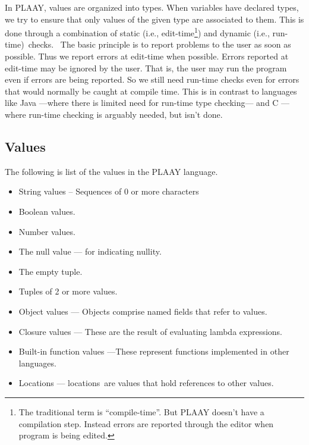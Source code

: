 \documentclass[12pt]{article}
\begin{document}
In PLAAY, values are organized into types. When variables have declared
types, we try to ensure that only values of the given type are associated to
them. This is done through a combination of static (i.e., edit-time\footnote{%
The traditional term is \textquotedblleft compile-time\textquotedblright .
But PLAAY doesn't have a compilation step. Instead errors are reported
through the editor when program is being edited.}) and dynamic (i.e.,
run-time)\ checks. \ The basic principle is to report problems to the user
as soon as possible. Thus we report errors at edit-time when possible.
Errors reported at edit-time may be ignored by the user. That is, the user
may run the program even if errors are being reported. So we still need
run-time checks even for errors that would normally be caught at compile
time. This is in contrast to languages like Java ---where there is limited
need for run-time type checking--- and C ---where run-time checking is
arguably needed, but isn't done.

\subsection{Values}

The following is list of the values in the PLAAY language.

\begin{itemize}
\item String values -- Sequences of 0 or more characters

\item Boolean values.

\item Number values.

\item The null value --- for indicating nullity.

\item The empty tuple.

\item Tuples of 2 or more values.

\item Object values --- Objects comprise named fields that refer to values.

\item Closure values --- These are the result of evaluating lambda
expressions.

\item Built-in function values ---These represent functions implemented in
other languages.

\item Locations --- locations\ are values that hold references to other
values.
\end{itemize}
\end{document}
